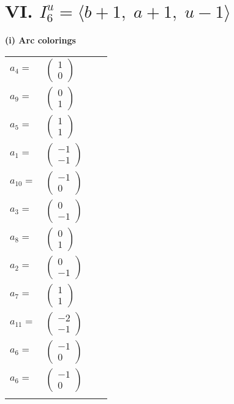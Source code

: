 \documentclass[1p]{elsarticle_modified}
\theoremstyle{definition}
\begin{document}
\centering \section*{VI. $I^u_{6}= \langle b+1,\;a+1,\;u-1 \rangle$}
\flushleft \textbf{(i) Arc colorings}\\
\begin{tabular}{m{7pt} m{180pt} m{7pt} m{180pt} }
\flushright $a_{4}=$&$\begin{pmatrix}1\\0\end{pmatrix}$ \\
\flushright $a_{9}=$&$\begin{pmatrix}0\\1\end{pmatrix}$ \\
\flushright $a_{5}=$&$\begin{pmatrix}1\\1\end{pmatrix}$ \\
\flushright $a_{1}=$&$\begin{pmatrix}-1\\-1\end{pmatrix}$ \\
\flushright $a_{10}=$&$\begin{pmatrix}-1\\0\end{pmatrix}$ \\
\flushright $a_{3}=$&$\begin{pmatrix}0\\-1\end{pmatrix}$ \\
\flushright $a_{8}=$&$\begin{pmatrix}0\\1\end{pmatrix}$ \\
\flushright $a_{2}=$&$\begin{pmatrix}0\\-1\end{pmatrix}$ \\
\flushright $a_{7}=$&$\begin{pmatrix}1\\1\end{pmatrix}$ \\
\flushright $a_{11}=$&$\begin{pmatrix}-2\\-1\end{pmatrix}$ \\
\flushright $a_{6}=$&$\begin{pmatrix}-1\\0\end{pmatrix}$\\ \flushright $a_{6}=$&$\begin{pmatrix}-1\\0\end{pmatrix}$\\&\end{tabular}
\end{document}
